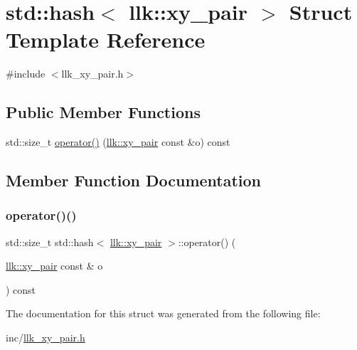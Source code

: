 \hypertarget{structstd_1_1hash_3_01llk_1_1xy__pair_01_4}{}\section{std\+:\+:hash$<$ llk\+:\+:xy\+\_\+pair $>$ Struct Template Reference}
\label{structstd_1_1hash_3_01llk_1_1xy__pair_01_4}


{\ttfamily \#include $<$llk\+\_\+xy\+\_\+pair.\+h$>$}

\subsection*{Public Member Functions}
\begin{DoxyCompactItemize}
\item 
std\+::size\+\_\+t \hyperlink{structstd_1_1hash_3_01llk_1_1xy__pair_01_4_ae4dec4648fbc30a1d328be77b17f9b34}{operator()} (\hyperlink{structllk_1_1xy__pair}{llk\+::xy\+\_\+pair} const \&o) const
\end{DoxyCompactItemize}


\subsection{Member Function Documentation}
\mbox{\label{structstd_1_1hash_3_01llk_1_1xy__pair_01_4_ae4dec4648fbc30a1d328be77b17f9b34}} 
\subsubsection{\texorpdfstring{operator()()}{operator()()}}
{\footnotesize\ttfamily std\+::size\+\_\+t std\+::hash$<$ \hyperlink{structllk_1_1xy__pair}{llk\+::xy\+\_\+pair} $>$\+::operator() (\begin{DoxyParamCaption}\item[{\hyperlink{structllk_1_1xy__pair}{llk\+::xy\+\_\+pair} const \&}]{o }\end{DoxyParamCaption}) const\hspace{0.3cm}{\ttfamily [inline]}}



The documentation for this struct was generated from the following file\+:\begin{DoxyCompactItemize}
\item 
inc/\hyperlink{llk__xy__pair_8h}{llk\+\_\+xy\+\_\+pair.\+h}\end{DoxyCompactItemize}
